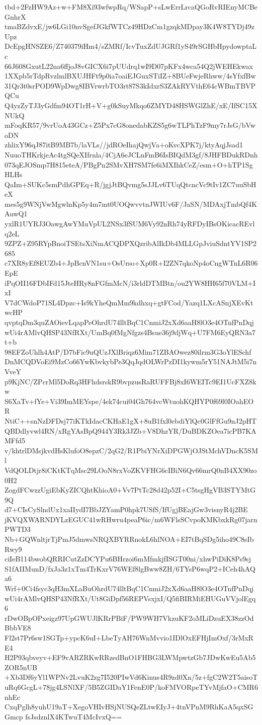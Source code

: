 tbd+2FzHW9Az+w+FM8Xi93wfwpRq/WSapP+sLwErrLrcaQGoRvRIEnyMCBeGnhrX
tmaBZdvxE/jw6LGi10nvSgefJGkfWTCz49HDzCm1gzqkMDpay3K4W8TYDj49zUpz
DcEpgHNSZE6/Z740379iHm4/sZMRf/IcvTuxZdUJGRf1yS49rSGHbHpydowptaLc
66J608GxutL22na6ffjoJ8vGICX6i7pUUdrq1wI9D07pKFx4wca54Q2jWEHEkwax
1XXpb5rTdpRvzlmlBXUJHFt9p0ia7oaiEJGuxSTiIZ+8BUeFwjeRhww/4sYfxfBw
31Qr3t0srPOD9WpDwg8IBVrwrbTO3rt87S3kIdxrS3ZAkRYVthE64cWBmTBVPQCu
Q4yzZyTJ3yGdfm94OT1rH+V+g0kSuyMkqo6ZMYD48HSWGlZhE/xE/IfSC15XNUkQ
mFoqKR57/9vrUoA43GCz+Z5Px7cG8onedabKZS5g6wTLPhTzF9my7rJsG/bVwoDN
zhlixY96qJ87itB9MB7b/laVLs//jdROeIhajQwjVa+oKvcXPK7j/ktyAqjJsad1
NuuoTHKrkjeAc4tgSQeXIfrnla/4CjA6eJCLnFmB6IsBIQdM3gf/8JHFBDukRDnh
073qEJOSmp7H815eteA/PBgPn2SMvXH7SM7fe6iMXIhkCeZ/esm+O+hTP1SgHLHs
QaIm+SUKc5smPdhGPEq+R/jgjJtBQvmg5sJJLv6TUqQtcncVc9tIv1ZC7uuSbHeX
mes5g9WNjVwMgwlnKp5y4m7mt0UOQwvvtnJWIUv6F/JaSN/MDAxjTmbQf4KAuwQ1
yxlR1UYRJ3OawgAwYMuVpUL2NSx3fSUM6Vy92nRh74yRFDyIBsOKicacREvlq2eL
9ZPZ+Z95RYpBnoiTSEtsXiNmACQDPXQzribAlIkDb4MLLGpJviuSdntYV1SP2685
c7XR8yEf8EUZb4+JpBcnVN1su+OsUrso+Xp0R+I2ZN7qkoNp4oCngWTnL6R06EpE
iPqOII16FDbIFd15JteHRy8nFGfmMcN/i3rldDTMBtn/ou2YW8HH65f70VLM+IxI
V7dCWdoP71SL4Dpzc+Is9kYheQmMm9kdhxq+gtFCod/Yazq1LXcASnjXEvKtwcHP
qvptqDm3quZAOievLqapPeOhrdU74lltBqC1CnmiJ2xXd6aaH8lO3e4OTnfPnDqj
wUi4rAMlvQHSP43NfRXt/UmBq0fMgNfgzs4Bsue36j9djWq+U7FM6EyQRN3a7t+b
98EFZoUhlh4AtP/D7bFic9uQUzJXlBriqz6Mim71ZBAOwez80ilrm3G3oYlESchf
DnMCQDVoEi9MzCo66YwKbvkybPe3QqJqdOLWrPzDI1kywm5rY51NAJtM5i7nVveY
p9KjNC/ZPcrMl5DoRq3HFhdsrskR9bvpzusRaRUFFBj8xI6WEITc9EI1UcFXZ8kw
S6XaTv+fYe+Vi39ImMEYspe/4ek74cui04Gh764vcWtuohKQHYP0f69l0IOahEOR
NtiC++snNzDFDsj77iKTkIdacCKHaE1gX+8uB1fxl0ebdiYlQc0GlFfGu9nJ2pHT
QBDdlyvwl4RN/xRgYAsBpQ944Y3Rk3JZb+V8DhzYR/DuBDKZOea7icPB7KAMFfd5
v/khtrlDMsjkvdHsKlufoO8epzC/2qG2/R1PbiYNrXiDPGWjOJStMchVDncK5SMl
VdQOLDtjr8iCKtKTqMsc29LOoN8rxVoZKVFHG6cIBiN6Qv66mrQ0nB4XX90zo0H2
ZogdFCwzzUgiEbKyZICQhtKhioA0+Vv7PtTc28d42p52I+C5tsgHgVB3STYMtG9Q
d7+CIsCySlndUx1xaIIydI7BbJZYamP0hpk7USfS/IfUgjBEajGw3visnyR4j2BE
jKVQXWARNDYLzEGUC41wRHwru4peaP6ic/m6WFlsSCvpoKMKbxkRg07jarnPWTD3
Nb+GQWnltjrTjPmJ5dmwsNRQXBYRRnokL6hlNOA+EI7tBqSDg5iho49C8sIbRwy9
ciIeB114bwobQRRICutZzDCYPu6BHrzoi6mMfmkjfISGT00ni/xhwPiDiK8Ps9sj
S1fAIIMunD/fxJa3z1xTm4TrKxrV76WEf8lgBww8ZH/6TYsP6wqP2+ICeh4hAQa6
Wrf+0Ci4fsyc3qH3mXLaBuOhrdU74lltBqC1CnmiJ2xXd6aaH8lO3e4OTnfPnDqj
wUi4rAMlvQHSP43NfRXt/Ut8GiDpf56REPVsxjxI/Q5fiBIRMiEHUGuVVjolEgq6
rDwOBpOPxeigz97UpGWUJlKRrPBiF/PW9WH7VkzuKF2oMLiDzuEX38zzOdBbbVE8
Fl2st7Pr6sw1SGTp+ypcK6uI+LbeTyAH76WnMvvio1IDlOxEFHjImOxf/3rMxRE4
H2P93qbveyv+EF9vARZRKwRRzedBnO1FHBG3LWMpwtzGb7JDwKwEu5Ab5ZOR5nUB
+Xb3Df6yYl1WPNv2LvuK2zg7I520PIwVd6Kinus4R9zd0Xn/5z+fgC2W2T5aisoT
uRq6GcgL+78jg4LSNlXF/5B5ZGIDaY1FenE0P/koFMVORpeTYvMjfaO+CMR6nhEc
CxqPglh8yuhU19aT+XegoVHIvHSjNUSQeZLtwEIyJ+4tnVPnM9RhKaA5qxSGGmcp
fsJsdznlX4KTwuT4McIvxQ==
